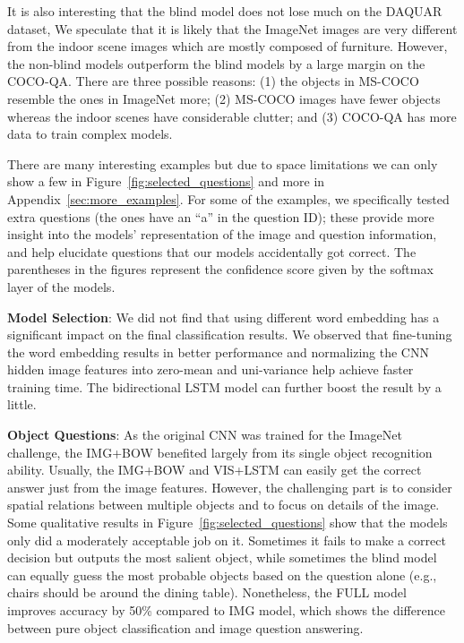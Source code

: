 \documentclass{article} %
\renewcommand{\#}[1]{\textbf{#1}}
\begin{document}
It is also interesting that the blind model does not 
lose much on the DAQUAR dataset,
We speculate that it is likely that the
ImageNet images are very different from the indoor scene images which are
mostly composed of furniture. 
However, the non-blind models
outperform the blind models by a large margin on the COCO-QA. There
are three possible reasons: (1) the objects in MS-COCO resemble the
ones in ImageNet more; (2) MS-COCO images have fewer objects whereas the
indoor scenes have considerable clutter; and (3) COCO-QA has more data to 
train complex models.

There are many interesting examples but 
due to space limitations we can only
show a few in Figure~\ref{fig:selected_questions} and more in
Appendix~\ref{sec:more_examples}.
For some of the examples, we
specifically tested extra questions 
(the ones have an ``a'' in the question
ID); these provide more insight into the models' representation
of the image and question information, and
help elucidate questions that our models accidentally 
got correct. The parentheses in the figures 
represent the confidence score given 
by the softmax layer of the models. 

\textbf{Model Selection}:
We did not find that using different word embedding 
has a significant impact on the final classification results. 
We observed that fine-tuning the word embedding results in better performance 
and 
normalizing the CNN hidden image features into zero-mean and uni-variance 
help achieve faster training time. The bidirectional LSTM model can further 
boost the result by a little. 

\textbf{Object Questions}:
As the original CNN was trained for the ImageNet challenge, the IMG+BOW
benefited largely from its single object recognition ability. Usually, 
the IMG+BOW and VIS+LSTM can easily get the correct
answer just from the image features. However, the challenging part is to
consider spatial relations between multiple objects and to focus on details of
the image. Some qualitative results in 
Figure~\ref{fig:selected_questions} show
that the models only did a moderately acceptable job on it. Sometimes it
fails to make a correct decision but outputs the most salient object, while
sometimes the blind model can equally guess the most probable objects based 
on the question alone (e.g., chairs should be around the dining table). 
Nonetheless, the FULL model improves accuracy by 50\% compared to IMG model, 
which shows the difference between pure object classification 
and image question answering.
\end{document}
